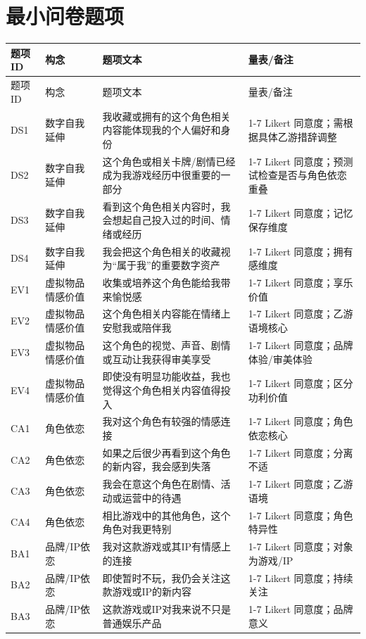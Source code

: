 \documentclass[UTF8,zihao=-4]{ctexart}
\begin{document}
\section{最小问卷题项}
\begin{longtable}{p{1.4cm}p{2.5cm}p{7.5cm}p{3.2cm}}
\toprule 题项ID & 构念 & 题项文本 & 量表/备注 \\ \midrule
\endfirsthead \toprule 题项ID & 构念 & 题项文本 & 量表/备注 \\ \midrule \endhead
DS1 & 数字自我延伸 & 我收藏或拥有的这个角色相关内容能体现我的个人偏好和身份 & 1-7 Likert 同意度；需根据具体乙游措辞调整 \\
DS2 & 数字自我延伸 & 这个角色或相关卡牌/剧情已经成为我游戏经历中很重要的一部分 & 1-7 Likert 同意度；预测试检查是否与角色依恋重叠 \\
DS3 & 数字自我延伸 & 看到这个角色相关内容时，我会想起自己投入过的时间、情绪或经历 & 1-7 Likert 同意度；记忆保存维度 \\
DS4 & 数字自我延伸 & 我会把这个角色相关的收藏视为“属于我”的重要数字资产 & 1-7 Likert 同意度；拥有感维度 \\
EV1 & 虚拟物品情感价值 & 收集或培养这个角色能给我带来愉悦感 & 1-7 Likert 同意度；享乐价值 \\
EV2 & 虚拟物品情感价值 & 这个角色相关内容能在情绪上安慰我或陪伴我 & 1-7 Likert 同意度；乙游语境核心 \\
EV3 & 虚拟物品情感价值 & 这个角色的视觉、声音、剧情或互动让我获得审美享受 & 1-7 Likert 同意度；品牌体验/审美体验 \\
EV4 & 虚拟物品情感价值 & 即使没有明显功能收益，我也觉得这个角色相关内容值得投入 & 1-7 Likert 同意度；区分功利价值 \\
CA1 & 角色依恋 & 我对这个角色有较强的情感连接 & 1-7 Likert 同意度；角色依恋核心 \\
CA2 & 角色依恋 & 如果之后很少再看到这个角色的新内容，我会感到失落 & 1-7 Likert 同意度；分离不适 \\
CA3 & 角色依恋 & 我会在意这个角色在剧情、活动或运营中的待遇 & 1-7 Likert 同意度；乙游语境 \\
CA4 & 角色依恋 & 相比游戏中的其他角色，这个角色对我更特别 & 1-7 Likert 同意度；角色特异性 \\
BA1 & 品牌/IP依恋 & 我对这款游戏或其IP有情感上的连接 & 1-7 Likert 同意度；对象为游戏/IP \\
BA2 & 品牌/IP依恋 & 即使暂时不玩，我仍会关注这款游戏或IP的新内容 & 1-7 Likert 同意度；持续关注 \\
BA3 & 品牌/IP依恋 & 这款游戏或IP对我来说不只是普通娱乐产品 & 1-7 Likert 同意度；品牌意义 \\

\end{longtable}
\end{document}

